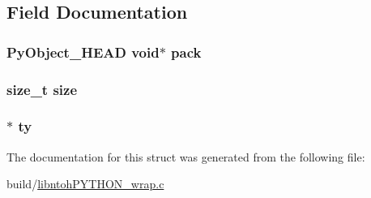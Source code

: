 \subsection{Field Documentation}
\hypertarget{struct_swig_py_packed_ac20a1b03d60c73f985a7f11d841cbf23}{
\subsubsection[{pack}]{\setlength{\rightskip}{0pt plus 5cm}Py\-Object\-\_\-\-H\-E\-A\-D void$\ast$ pack}}\label{struct_swig_py_packed_ac20a1b03d60c73f985a7f11d841cbf23}
\hypertarget{struct_swig_py_packed_a854352f53b148adc24983a58a1866d66}{
\subsubsection[{size}]{\setlength{\rightskip}{0pt plus 5cm}size\-\_\-t size}}\label{struct_swig_py_packed_a854352f53b148adc24983a58a1866d66}
\hypertarget{struct_swig_py_packed_a6b6270e5da3083fb1e9476b22a0611ad}{
\subsubsection[{ty}]{$\ast$ ty}}\label{struct_swig_py_packed_a6b6270e5da3083fb1e9476b22a0611ad}


The documentation for this struct was generated from the following file\-:\begin{DoxyCompactItemize}
\item 
build/\hyperlink{libntoh_p_y_t_h_o_n__wrap_8c}{libntoh\-P\-Y\-T\-H\-O\-N\-\_\-wrap.\-c}\end{DoxyCompactItemize}

